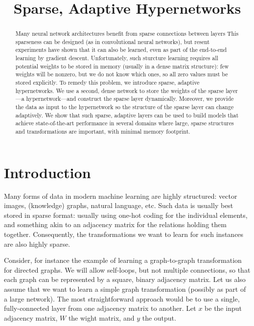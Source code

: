 \documentclass[11pt]{article}
\title{Sparse, Adaptive Hypernetworks}
\begin{document}
\maketitle

\begin{abstract}
Many neural network architectures benefit from sparse connections between layers This sparseness can be designed (as in convolutional neural networks), but resent experiments have shown that it can also be learned, even as part of the end-to-end learning by gradient descent. Unfortunately, such sturcture learning requires all potential weights to be stored in memory (usually in a dense matrix structure): few weights will be nonzero, but we do not know which ones, so all zero values must be stored explicitly. To remedy this problem, we introduce sparse, adaptive hypernetworks. We use a second, dense network to store the weights of the sparse layer---a hypernetwork---and construct the sparse layer dynamically. Moreover, we provide the data as input to the hypernetwork so the structure of the sparse layer can change adaptively. We show that such sparse, adaptive layers can be used to build models that achieve state-of-the-art performance in several domains where large, sparse structures and transformations are important, with minimal memory footprint.
\end{abstract}

\section{Introduction}

Many forms of data in modern machine learning are highly structured: vector images, (knowledge) graphs, natural language, etc. Such data is usually best stored in sparse format: usually using one-hot coding for the individual elements, and something akin to an adjacency matrix for the relations holding them together. Consequently, the transformations we want to learn for such instances are also highly sparse. 

Consider, for instance the example of learning a graph-to-graph transformation for directed graphs. We will allow self-loops, but not multiple connections, so that each graph can be represented by a square, binary adjacency matrix. Let us also assume that we want to learn a simple graph transformation (possibly as part of a large network). The most straightforward approach would be to use a single, fully-connected layer from one adjacency matrix to another. Let $x$ be the input adjacency matrix, $W$ the wight matrix, and $y$ the output.
\end{document}
